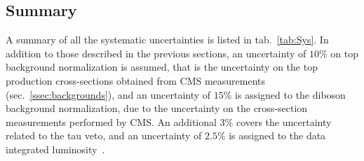 \subsection{Summary}

A summary of all the systematic uncertainties is listed in tab.~\ref{tab:Sys}. In addition to those described in the previous sections, an uncertainty of $10\%$ on top background normalization is assumed, that is the uncertainty on the top production cross-sections obtained from CMS measurements (sec.~\ref{ssec:backgrounds}), and an uncertainty of $15\%$ is assigned to the diboson background normalization, due to the uncertainty on the cross-section measurements performed by CMS. An additional $3\%$ covers the uncertainty related to the tau veto, and an uncertainty of $2.5\%$ is assigned to the data integrated luminosity~\cite{CMS:2017sdi}.



